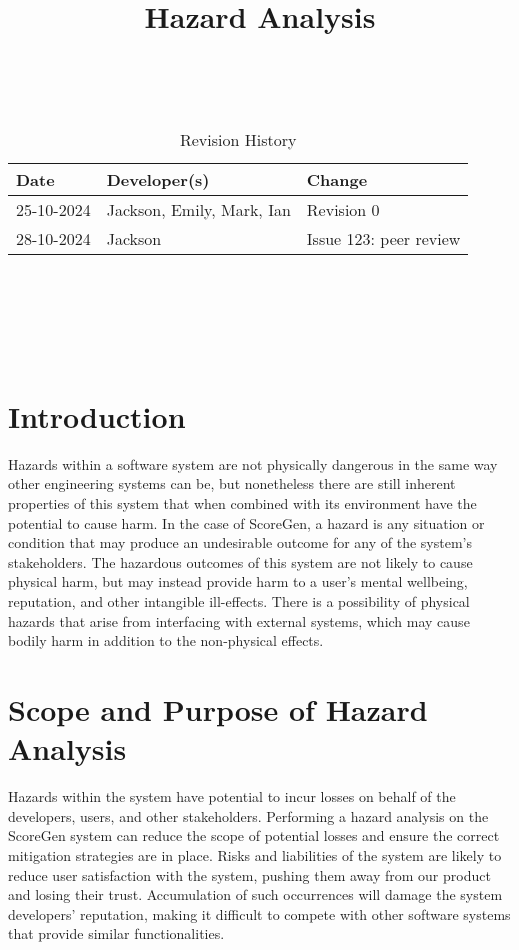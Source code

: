 \documentclass{article}
\title{Hazard Analysis\\\progname}
\author{\authname}
\date{}
\begin{document}
\maketitle
\thispagestyle{empty}

~\newpage


\begin{table}[hp]
\caption{Revision History} \label{TblRevisionHistory}
\begin{tabularx}{\textwidth}{llX}
\toprule
\textbf{Date} & \textbf{Developer(s)} & \textbf{Change}\\
\midrule
25-10-2024 & Jackson, Emily, Mark, Ian & Revision 0\\
28-10-2024 & Jackson & Issue 123: peer review\\
\bottomrule
\end{tabularx}
\end{table}

~\newpage

\tableofcontents

~\newpage

\listoftables

~\newpage


\section{Introduction}

Hazards within a software system are not physically dangerous in the same way other engineering systems can be, 
but nonetheless there are still inherent properties of this system that when combined with its environment have 
the potential to cause harm. In the case of ScoreGen, a hazard is any situation or condition that may produce an 
undesirable outcome for any of the system’s stakeholders. The hazardous outcomes of this system are not likely to 
cause physical harm, but may instead provide harm to a user’s mental wellbeing, reputation, and other intangible 
ill-effects. There is a possibility of physical hazards that arise from interfacing with external systems, which 
may cause bodily harm in addition to the non-physical effects.

\section{Scope and Purpose of Hazard Analysis}

Hazards within the system have potential to incur losses on behalf of the developers, users, and other stakeholders. 
Performing a hazard analysis on the ScoreGen system can reduce the scope of potential losses and ensure the correct 
mitigation strategies are in place. Risks and liabilities of the system are likely to reduce user satisfaction with 
the system, pushing them away from our product and losing their trust. Accumulation of such occurrences will damage 
the system developers’ reputation, making it difficult to compete with other software systems that provide similar 
functionalities. \\
\end{document}
